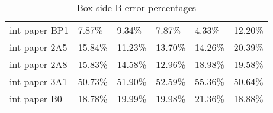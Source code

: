 \documentclass[11pt, twoside, reqno]{book}
\begin{document}
\begin{table}[]
\begin{tabular}{llllll}
		int paper BP1       & 7.87\%           & 9.34\%           & 7.87\%           & 4.33\%           & 12.20\%          \\
		int paper 2A5       & 15.84\%          & 11.23\%          & 13.70\%          & 14.26\%          & 20.39\%          \\
		int paper 2A8       & 15.83\%          & 14.58\%          & 12.96\%          & 18.98\%          & 19.58\%          \\
		int paper 3A1       & 50.73\%          & 51.90\%          & 52.59\%          & 55.36\%          & 50.64\%          \\
		int paper B0        & 18.78\%          & 19.99\%          & 19.98\%          & 21.36\%          & 18.88\%         
	\end{tabular}
\caption{Box side B error percentages}
\end{table}
\end{document}
